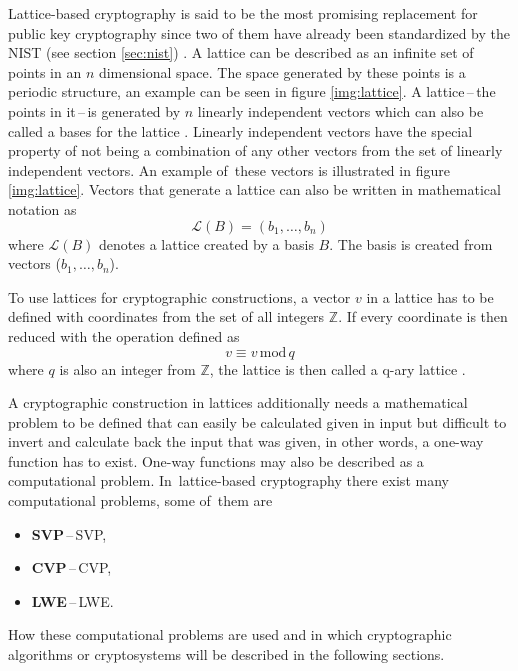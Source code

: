Lattice-based cryptography is said to be the most promising replacement for public key cryptography since two of them have already been standardized by the NIST (see section \ref{sec:nist}) \cite{Alagic2022}. A lattice can be described as an infinite set of points in an $n$ dimensional space. The space generated by these points is a periodic structure, an example can be seen in figure \ref{img:lattice}. A lattice\,--\,the points in it\,--\,is generated by $n$ linearly independent vectors which can also be called a bases for the lattice \cite{Ajati1996}. Linearly independent vectors have the special property of not being a combination of any other vectors from the set of linearly independent vectors. An example of~these vectors is illustrated in figure \ref{img:lattice}. Vectors that generate a lattice can also be written in mathematical notation as
\begin{equation}
  \mathcal{L}(B)=(b_1,\dots,b_n)
\end{equation}
where $\mathcal{L}(B)$ denotes a lattice created by a basis $B$. The basis is created from vectors ($b_1,\dots,b_n$).


To use lattices for cryptographic constructions, a vector $v$ in a lattice has to be defined with coordinates from the set of all integers $\mathbb{Z}$. If every coordinate is then reduced with the operation defined as
\begin{equation}
  v\equiv v\,\mathrm{mod}\,q
\end{equation}
where $q$ is also an integer from $\mathbb{Z}$, the lattice is then called a q-ary lattice \cite{Bernstein2009}.

A cryptographic construction in lattices additionally needs a mathematical problem to be defined that can easily be calculated given in input but difficult to invert and calculate back the input that was given, in other words, a one-way function has to exist. One-way functions may also be described as a computational problem. In~lattice-based cryptography there exist many computational problems, some of~them are \cite{Bernstein2009}
\begin{itemize}
  \item \textbf{SVP}\,--\,\acl{SVP},
  \item \textbf{CVP}\,--\,\acl{CVP},
  \item \textbf{LWE}\,--\,\acl{LWE}.
\end{itemize}
How these computational problems are used and in which cryptographic algorithms or cryptosystems will be described in the following sections.
